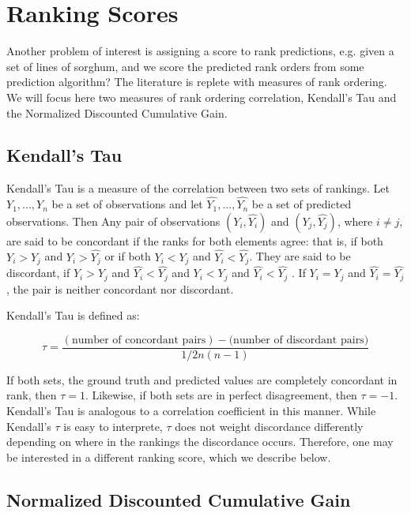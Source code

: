 \section{Ranking Scores}
Another problem of interest is assigning a score to rank predictions, e.g. given a set of lines of sorghum, and we score the predicted rank orders from some prediction algorithm? The literature is replete with measures of rank ordering. We will focus here two measures of rank ordering correlation, Kendall's Tau and the Normalized Discounted Cumulative Gain. 


\subsection{Kendall's Tau}

Kendall's Tau is a measure of the correlation between two sets of rankings. Let $Y_1, ..., Y_n$  be a set of observations and let $\hat{Y_1}, ..., \hat{Y_n}$ be a set of predicted observations. Then Any pair of observations $(Y_i, \hat{Y_i})$ and $(Y_j, \hat{Y_j})$, where $i \not= j$, are said to be concordant if the ranks for both elements agree: that is, if both $Y_i > Y_j$ and $\hat{Y_i} > \hat{Y_j}$ or if both $Y_i < Y_j$ and $\hat{Y_i} < \hat{Y_j}$. They are said to be discordant, if $Y_i > Y_j$ and $\hat{Y_i} < \hat{Y_j}$ and $Y_i < Y_j$ and $\hat{Y_i} < \hat{Y_j}$ . If $Y_i = Y_j$ and $\hat{Y_i} = \hat{Y_j}$, the pair is neither concordant nor discordant.

Kendall's Tau is defined as:

\begin{equation}
	\tau = \frac{(\text{number of concordant pairs}) - (\text{number of discordant pairs)}}{1/2 n(n-1)}
\end{equation}

If both sets, the ground truth and predicted values are completely concordant in rank, then $\tau = 1$. Likewise, if both sets are in perfect disagreement, then 
$\tau = -1$. Kendall's Tau is analogous to a correlation coefficient in this manner. While Kendall's $\tau$ is easy to interprete, $\tau$ does not weight discordance differently depending on where in the rankings the discordance occurs. Therefore, one may be interested in a different ranking score, which we describe below.


\subsection{Normalized Discounted Cumulative Gain}








